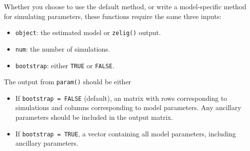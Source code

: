 Whether you choose to use the default method, or write a
model-specific method for simulating parameters, these functions
require the same three inputs:  
\begin{itemize}
\item {\tt object}: the estimated model or {\tt zelig()} output.
\item {\tt num}: the number of simulations.
\item {\tt bootstrap}: either {\tt TRUE} or {\tt FALSE}.  
\end{itemize}
The output from {\tt param()} should be either
\begin{itemize}
\item If {\tt bootstrap = FALSE} (default), an matrix with rows
corresponding to simulations and columns corresponding to model
parameters.  Any ancillary parameters should be included in the output
matrix.  
\item If {\tt bootstrap = TRUE}, a vector containing all model
parameters, including ancillary parameters.    
\end{itemize} 

